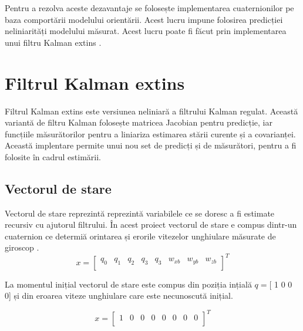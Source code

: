 \-\hspace{1cm}Pentru a rezolva aceste dezavantaje se folosește implementarea cuaternionilor pe baza comportării modelului orientării. Acest lucru impune folosirea predicției neliniarități modelului măsurat. Acest lucru poate fi făcut prin implementarea unui filtru Kalman extins \cite{quatro}.


\section{Filtrul Kalman extins}
\-\hspace{1cm}Filtrul Kalman extins este versiunea neliniară a filtrului Kalman regulat. Această variantă de filtru Kalman folosește matricea Jacobian pentru predicție, iar funcțiile măsurătorilor pentru a liniariza estimarea stării curente și a covarianței. Această implentare permite unui nou set de predicți și de măsurători, pentru a fi folosite în cadrul estimării.

\subsection{Vectorul de stare}
\-\hspace{1cm}Vectorul de stare reprezintă reprezintă variabilele ce se doresc a fi estimate recursiv cu ajutorul filtrului. În acest proiect vectorul de stare e compus dintr-un cuaternion ce determiă orintarea și erorile vitezelor unghiulare măsurate de giroscop \cite{kalman1}.
\begin{equation}
{\mathsf{\textit{x}} = 
\begin{bmatrix}
q_0 & q_1 & q_2 & q_3 & q_3 & w_{xb} & w_{yb} & w_{zb}\\
\end{bmatrix}}^T
\end{equation}

\-\hspace{1cm}La momentul inițial vectorul de stare este compus din poziția ințială  $q=$[ 1 0 0 0] și din eroarea viteze unghiulare care este necunoscută inițial.

\begin{equation}
{\mathsf{\textit{x}} = 
\begin{bmatrix}
1 & 0 & 0 & 0 & 0 & 0 & 0 & 0\\
\end{bmatrix}}^T
\end{equation}

